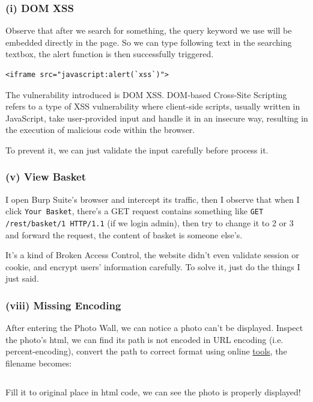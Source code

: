 \documentclass[12pt]{article}
\begin{document}
\subsubsection*{(i) DOM XSS}
Observe that after we search for something, the query keyword we use will be embedded directly in the page. So we can type following text in the searching textbox, the alert function is then successfully triggered.
\begin{verbatim}
<iframe src="javascript:alert(`xss`)">
\end{verbatim}

The vulnerability introduced is DOM XSS. DOM-based Cross-Site Scripting refers to a type of XSS vulnerability where client-side scripts, usually written in JavaScript, take user-provided input and handle it in an insecure way, resulting in the execution of malicious code within the browser.

To prevent it, we can just validate the input carefully before process it.
\subsubsection*{(v) View Basket}
I open Burp Suite's browser and intercept its traffic, then I observe that when I click \texttt{Your Basket}, there's a GET request contains something like \texttt{GET /rest/basket/1 HTTP/1.1} (if we login admin), then try to change it to 2 or 3 and forward the request, the content of basket is someone else's.

It's a kind of Broken Access Control, the website didn't even validate session or cookie, and encrypt users' information carefully. To solve it, just do the things I just said.
\subsubsection*{(viii) Missing Encoding}
After entering the Photo Wall, we can notice a photo can't be displayed. Inspect the photo's html, we can find its path is not encoded in URL encoding (i.e. percent-encoding), convert the path to correct format using online \href{https://checkserp.com/encode/urlencode/}{tools}, the filename becomes:
\begin{Verbatim}[breaklines]
%e1%93%9a%e1%98%8f%e1%97%a2-%23zatschi-%23whoneedsfourlegs-1572600969477.jpg
\end{Verbatim}

Fill it to original place in html code, we can see the photo is properly displayed!
\end{document}
